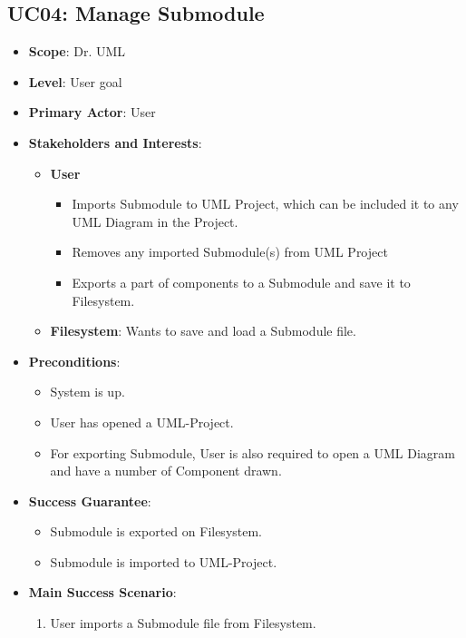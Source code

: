 \documentclass[12pt]{article}
\begin{document}
    \subsection{UC04: Manage Submodule}
    \begin{itemize}
        \item \textbf{Scope}: Dr. UML
        \item \textbf{Level}: User goal
        \item \textbf{Primary Actor}: User
        \item \textbf{Stakeholders and Interests}:
        \begin{itemize}
            \item \textbf{User}
            \begin{itemize}
                \item { Imports Submodule to UML Project, which can be included it to any UML Diagram in the Project. }
                \item { Removes any imported Submodule(s) from UML Project }
                \item { Exports a part of components to a Submodule and save it to Filesystem. }
            \end{itemize}
            \item \textbf{Filesystem}: Wants to save and load a Submodule file.
        \end{itemize}
        \item \textbf{Preconditions}:
        \begin{itemize}
            \item System is up.
            \item User has opened a UML-Project.
            \item For exporting Submodule, User is also required to open a UML Diagram and have a number of Component drawn.
        \end{itemize}
        \item \textbf{Success Guarantee}:
        \begin{itemize}
            \item Submodule is exported on Filesystem.
            \item Submodule is imported to UML-Project.
        \end{itemize}
        \item \textbf{Main Success Scenario}:
        \begin{enumerate}
            \item User imports a Submodule file from Filesystem.

\end{enumerate}
\end{itemize}
\end{document}
